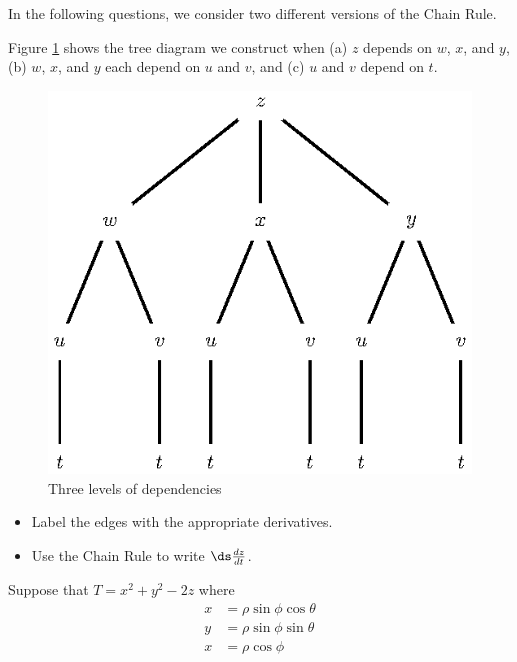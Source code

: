 \begin{activity} \label{PA:10.13}  In the following questions, we consider two different versions of the Chain Rule.
\ba
\item Figure \ref{F:10.5.tree.2} shows the tree diagram we construct when (a) $z$ depends on $w$, $x$, and $y$, (b) $w$, $x$, and $y$ each depend on $u$ and $v$, and (c) $u$ and $v$ depend on $t$.

\begin{figure}[ht]
  \begin{center}
    \includegraphics{figures/fig_10_5_tree_2.eps}
  \end{center}
  \caption{Three levels of dependencies}
  \label{F:10.5.tree.2}
\end{figure}

\begin{itemize}
  \item Label the edges with the appropriate derivatives.
  \item Use the Chain Rule to write $\ds\frac{dz}{dt}$.
\end{itemize}

\item Suppose that $T = x^2 + y^2 - 2z$ where
  \begin{align*}
    x & = \rho\sin\phi\cos\theta \\
    y & = \rho\sin\phi\sin\theta \\
    x & = \rho\cos\phi \\
  \end{align*}


\end{activity}
